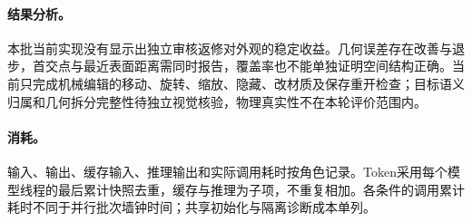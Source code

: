 \paragraph{结果分析。}
本批当前实现没有显示出独立审核返修对外观的稳定收益。几何误差存在改善与退步，首交点与最近表面距离需同时报告，覆盖率也不能单独证明空间结构正确。当前只完成机械编辑的移动、旋转、缩放、隐藏、改材质及保存重开检查；目标语义归属和几何拆分完整性待独立视觉核验，物理真实性不在本轮评价范围内。

\paragraph{消耗。}
输入、输出、缓存输入、推理输出和实际调用耗时按角色记录。Token采用每个模型线程的最后累计快照去重，缓存与推理为子项，不重复相加。各条件的调用累计耗时不同于并行批次墙钟时间；共享初始化与隔离诊断成本单列。

